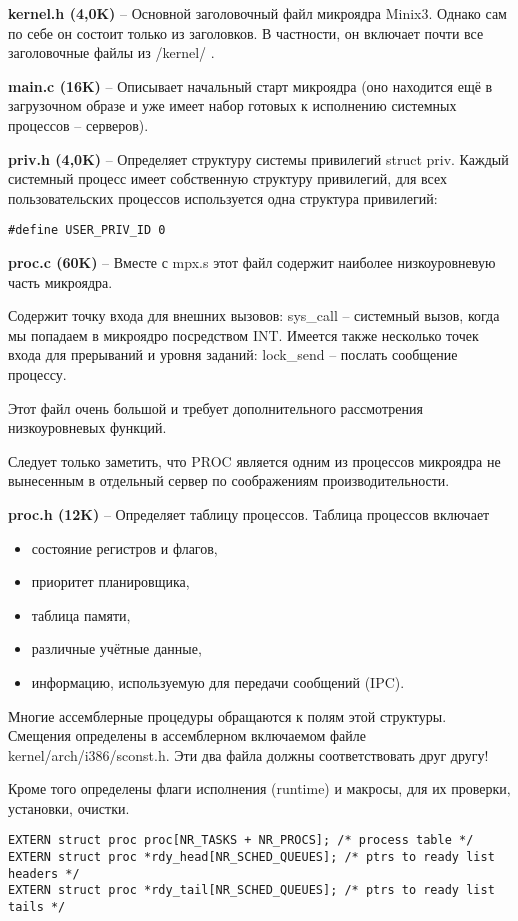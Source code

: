 \textbf{kernel.h (4,0K)} -- Основной заголовочный файл микроядра Minix3. Однако сам по себе он состоит только из заголовков. В частности, он включает почти все заголовочные файлы из /kernel/ .

\textbf{main.c (16K)} -- Описывает начальный старт микроядра (оно находится ещё в загрузочном образе и уже имеет набор готовых к исполнению системных процессов -- серверов).

\textbf{priv.h (4,0K)} -- Определяет структуру системы привилегий struct priv. Каждый системный процесс имеет собственную структуру привилегий, для всех пользовательских процессов используется одна
структура привилегий:

\begin{Verbatim}[frame=single]
#define USER_PRIV_ID 0
\end{Verbatim}

\textbf{proc.c (60K)} -- Вместе с mpx.s этот файл содержит наиболее низкоуровневую часть микроядра. 

Содержит точку входа для внешних вызовов: sys\_call -- системный вызов, когда мы попадаем в микроядро посредством INT. Имеется также несколько точек входа для прерываний и уровня заданий: lock\_send -- послать сообщение процессу.

Этот файл очень большой и требует дополнительного рассмотрения низкоуровневых функций.

Следует только заметить, что PROC является одним из процессов микроядра не вынесенным в отдельный сервер по соображениям производительности.

\textbf{proc.h (12K)} -- Определяет таблицу процессов. Таблица процессов включает
\begin{itemize}
\item состояние регистров и флагов,
\item приоритет планировщика,
\item таблица памяти,
\item различные учётные данные,
\item информацию, используемую для передачи сообщений (IPC).
\end{itemize}

Многие ассемблерные процедуры обращаются к полям этой структуры. Смещения определены в ассемблерном включаемом файле kernel/arch/i386/sconst.h. Эти два файла должны соответствовать друг другу!

Кроме того определены флаги исполнения (runtime) и макросы, для их проверки, установки, очистки.
\begin{Verbatim}[frame=single]
EXTERN struct proc proc[NR_TASKS + NR_PROCS]; /* process table */
EXTERN struct proc *rdy_head[NR_SCHED_QUEUES]; /* ptrs to ready list headers */
EXTERN struct proc *rdy_tail[NR_SCHED_QUEUES]; /* ptrs to ready list tails */
\end{Verbatim}

